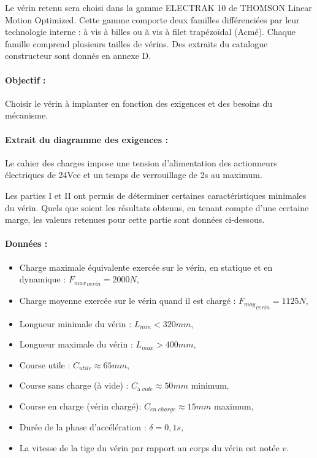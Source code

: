 Le vérin retenu sera choisi dans la gamme ELECTRAK 10 de THOMSON Linear Motion Optimized. Cette gamme comporte deux familles différenciées par leur technologie interne : à vis à billes ou à vis à filet trapézoïdal (Acmé). Chaque famille comprend plusieurs tailles de vérins. Des extraits du catalogue constructeur sont donnés en annexe D.

\paragraph{Objectif :}

Choisir le vérin à implanter en fonction des exigences et des besoins du
mécanisme.

\paragraph{Extrait du diagramme des exigences :}

Le cahier des charges impose une tension d’alimentation des actionneurs électriques de 24Vcc et un temps de verrouillage de 2s au maximum.

Les parties I et II ont permis de déterminer certaines caractéristiques minimales du vérin. Quels que soient les résultats obtenus, en tenant compte d’une certaine marge, les valeurs retenues pour cette partie sont données ci-dessous.

\paragraph{Données :}
\begin{itemize}
 \item Charge maximale équivalente exercée sur le vérin, en statique et en dynamique : ${F_{max}}_{verin}=2000 N$,
 \item Charge moyenne exercée sur le vérin quand il est chargé : ${F_{moy}}_{verin} = 1125 N$,
 \item Longueur minimale du vérin : $L_{min} < 320 mm$,
 \item Longueur maximale du vérin : $L_{max} > 400 mm$,
 \item Course utile : $C_{utile} \approx 65mm$,
 \item Course sans charge (à vide) : $C_{à\ vide} \approx 50 mm$ minimum,
 \item Course en charge (vérin chargé): $C_{en\ charge} \approx 15mm$ maximum,
 \item Durée de la phase d’accélération : $\delta = 0,1s$,
 \item La vitesse de la tige du vérin par rapport au corps du vérin est notée $v$.
\end{itemize}

